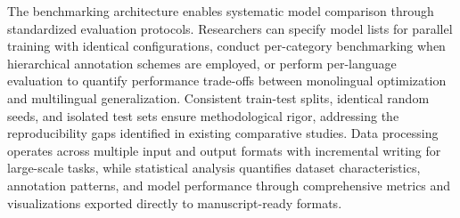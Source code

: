 \documentclass[12pt]{article}
\begin{document}
The benchmarking architecture enables systematic model comparison through standardized evaluation protocols. Researchers can specify model lists for parallel training with identical configurations, conduct per-category benchmarking when hierarchical annotation schemes are employed, or perform per-language evaluation to quantify performance trade-offs between monolingual optimization and multilingual generalization. Consistent train-test splits, identical random seeds, and isolated test sets ensure methodological rigor, addressing the reproducibility gaps identified in existing comparative studies. Data processing operates across multiple input and output formats with incremental writing for large-scale tasks, while statistical analysis quantifies dataset characteristics, annotation patterns, and model performance through comprehensive metrics and visualizations exported directly to manuscript-ready formats.

\newpage

\printbibliography
\end{document}
